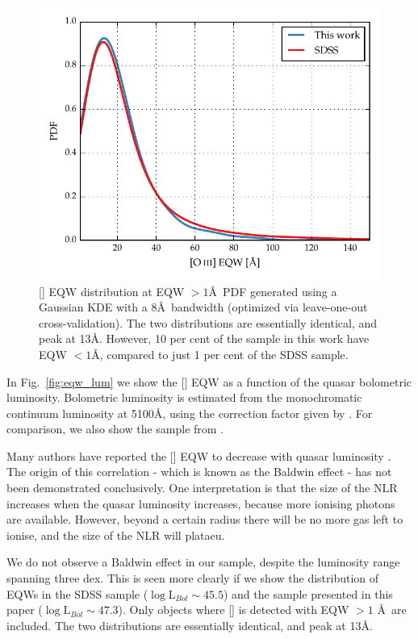 \begin{figure}[t!]
    \includegraphics[width=\columnwidth]{figures/chapter04/high_eqw_comp.pdf} 
    \caption[{}]{[] EQW distribution at EQW $>1$\AA\, PDF generated using a Gaussian KDE with a 8\AA\, bandwidth (optimized via leave-one-out cross-validation). The two distributions are essentially identical, and peak at 13\AA. However, 10 per cent of the sample in this work have EQW $<1$\AA, compared to just 1 per cent of the SDSS sample.}     
    \label{fig:high_eqw_comp}
\end{figure}

In Fig.~\ref{fig:eqw_lum} we show the [] EQW as a function of the quasar bolometric luminosity. 
Bolometric luminosity is estimated from the monochromatic continuum luminosity at 5100\AA, using the correction factor given by \citet{richards06}. 
For comparison, we also show the sample from \citet{shen11}.  

Many authors have reported the [] EQW to decrease with quasar luminosity \citep[e.g.][]{brotherton96,sulentic04,baskin05b}. 
The origin of this correlation - which is known as the Baldwin effect \citep[e.g.][]{baldwin77,brotherton96,zhang11,stern12} - has not been demonstrated conclusively. 
One interpretation is that the size of the NLR increases when the quasar luminosity increases, because more ionising photons are available. 
However, beyond a certain radius there will be no more gas left to ionise, and the size of the NLR will plataeu.

We do not observe a Baldwin effect in our sample, despite the luminosity range spanning three dex. 
This is seen more clearly if we show the distribution of EQWs in the SDSS sample ($\log{\mathrm L_{Bol}} \sim 45.5$\ergs) and the sample presented in this paper ($\log{\mathrm L_{Bol}} \sim 47.3$\ergs).
Only objects where [] is detected with EQW $>1$ \AA\, are included.
The two distributions are essentially identical, and peak at 13\AA. 


